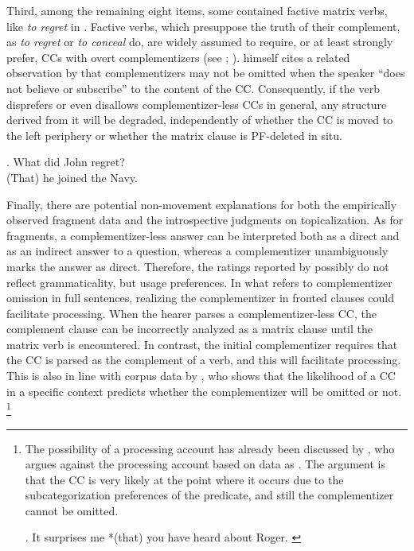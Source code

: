 Third, among the remaining eight items, some contained factive matrix verbs, like \textit{to regret} in \Next. Factive verbs, which presuppose the truth of their complement, as \textit{to regret} or \textit{to conceal} do, are widely assumed to require, or at least strongly prefer, CCs with overt complementizers (see ; ). \citet[689]{merchant2004} himself cites a related observation by \citet{morgan1973} that complementizers may not be omitted when the speaker ``does not believe or subscribe'' to the content of the CC. Consequently, if the verb disprefers or even disallows complementizer-less CCs in general, any structure derived from it will be degraded, independently of whether the CC is moved to the left periphery or whether the matrix clause is PF-deleted in situ.

\ex. What did John regret? \hfill \citep[31]{merchant.etal2013}\\
(That) he joined the Navy.

Finally, there are potential non-movement explanations for both the empirically observed fragment data and the introspective judgments on topicalization. As for fragments, a complementizer-less answer can be interpreted both as a direct and as an indirect answer to a question, whereas a complementizer unambiguously marks the answer as direct. 
Therefore, the ratings reported by \citet{merchant.etal2013} possibly do not reflect grammaticality, but usage preferences. 
In what refers to complementizer omission in full sentences, realizing the complementizer in fronted clauses could facilitate processing. When the hearer parses a complementizer-less CC, the complement clause can be incorrectly analyzed as a matrix clause until the matrix verb is encountered. In contrast, the initial complementizer requires that the CC is parsed as the complement of a verb, and this will facilitate processing. This is also in line with corpus data by \cite{jaeger2010}, who shows that the likelihood of a CC in a specific context predicts whether the complementizer will be omitted or not.%
%
\footnote{The possibility of a processing account has already been discussed by \citet[397]{stowell1981}, who argues against the processing account based on data as \Next. The argument is that the CC is very likely at the point where it occurs due to the subcategorization preferences of the predicate, and still the complementizer cannot be omitted.

\ex. It surprises me *(that) you have heard about Roger.  \hfill \citet[397]{stowell1981}

}\afterfn%
%

